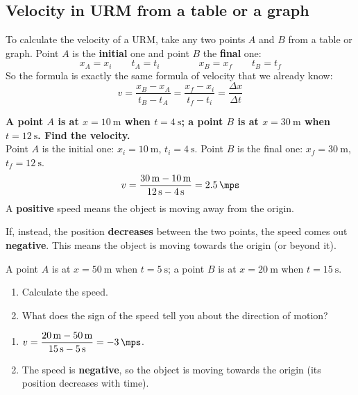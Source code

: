 \subsection{Velocity in URM from a table or a graph}

To calculate the velocity of a URM, take any two points \(A\) and \(B\) from a table or graph. Point \(A\) is the \textbf{initial} one and point \(B\) the \textbf{final} one:
\begin{equation*}
    x_A = x_i \qquad t_A = t_i \qquad\qquad x_B = x_f \qquad t_B = t_f
\end{equation*}
So the formula is exactly the same formula of velocity that we already know:
\begin{equation*}
    v = \dfrac{x_B - x_A}{t_B - t_A} = \dfrac{x_f - x_i}{t_f - t_i} = \dfrac{\Delta x}{\Delta t}
\end{equation*}

\begin{example}
    \textbf{A point \(A\) is at \(x = \qty{10}{\m}\) when \(t = \qty{4}{\s}\); a point \(B\) is at \(x = \qty{30}{\m}\) when \(t = \qty{12}{\s}\). Find the velocity.} \\
    Point \(A\) is the initial one: \(x_i = \qty{10}{\m}\), \(t_i = \qty{4}{\s}\). Point \(B\) is the final one: \(x_f = \qty{30}{\m}\), \(t_f = \qty{12}{\s}\).
    \begin{equation*}
        v = \dfrac{\qty{30}{\m} - \qty{10}{\m}}{\qty{12}{\s} - \qty{4}{\s}} = \qty{2.5}{\mps}
    \end{equation*}
    A \textbf{positive} speed means the object is moving away from the origin.
\end{example}

\begin{impt}
    If, instead, the position \textbf{decreases} between the two points, the speed comes out \textbf{negative}. This means the object is moving towards the origin (or beyond it).
\end{impt}

\begin{exercise}
    A point \(A\) is at \(x = \qty{50}{\m}\) when \(t = \qty{5}{\s}\); a point \(B\) is at \(x = \qty{20}{\m}\) when \(t = \qty{15}{\s}\).
    \begin{enumerate}[label=\letraminuscula]
        \item Calculate the speed.
        \item What does the sign of the speed tell you about the direction of motion?
    \end{enumerate}
    \begin{solu}
        \begin{enumerate}[label=\alph*)]
            \item \(v = \dfrac{\qty{20}{\m} - \qty{50}{\m}}{\qty{15}{\s} - \qty{5}{\s}} = \qty{-3}{\mps}\).
            \item The speed is \textbf{negative}, so the object is moving towards the origin (its position decreases with time).
        \end{enumerate}
    \end{solu}
\end{exercise}

